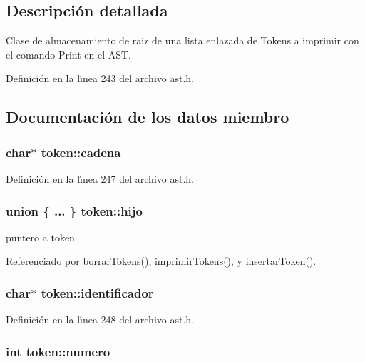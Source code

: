 \subsection{Descripci\'{o}n detallada}
Clase de almacenamiento de raiz de una lista enlazada de Tokens a imprimir con el comando Print en el AST. 



Definici\'{o}n en la l\'{\i}nea 243 del archivo ast.h.

\subsection{Documentaci\'{o}n de los datos miembro}
\subsubsection{\setlength{\rightskip}{0pt plus 5cm}char$\ast$ {\bf token::cadena}}\label{structtoken_o2}




Definici\'{o}n en la l\'{\i}nea 247 del archivo ast.h.
\subsubsection{\setlength{\rightskip}{0pt plus 5cm}union \{ ... \}  {\bf token::hijo}}\label{structtoken_o5}


puntero a token 



Referenciado por borrar\-Tokens(), imprimir\-Tokens(), y insertar\-Token().
\subsubsection{\setlength{\rightskip}{0pt plus 5cm}char$\ast$ {\bf token::identificador}}\label{structtoken_o3}




Definici\'{o}n en la l\'{\i}nea 248 del archivo ast.h.
\subsubsection{\setlength{\rightskip}{0pt plus 5cm}int {\bf token::numero}}\label{structtoken_o4}




